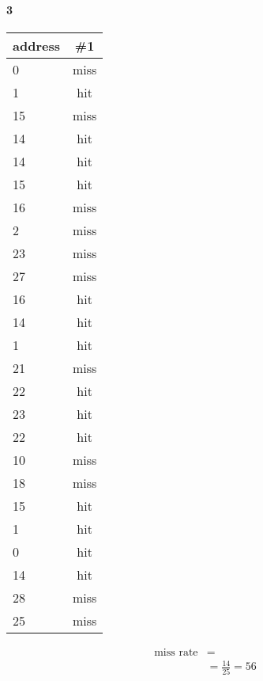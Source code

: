 \documentclass[11pt]{article}
\begin{document}
\paragraph{3}
\begin{center}
	\begin{tabular}{l || c}
		address & \#1 \\
		\hline
		0  & miss \\
		1  & hit  \\
		15 & miss \\
		14 & hit  \\
		14 & hit  \\
		15 & hit  \\
		16 & miss \\
		2  & miss \\
		23 & miss \\
		27 & miss \\
		16 & hit  \\
		14 & hit  \\
		1  & hit  \\
		21 & miss \\
		22 & hit  \\
		23 & hit  \\
		22 & hit  \\
		10 & miss \\
		18 & miss \\
		15 & hit  \\
		1  & hit  \\
		0  & hit  \\
		14 & hit  \\
		28 & miss \\
		25 & miss \\
	\end{tabular}
	\begin{align*}
		\text{miss rate} &= \\
		&= \frac{14}{25} = 56%
	\end{align*}
\end{center}
\end{document}
